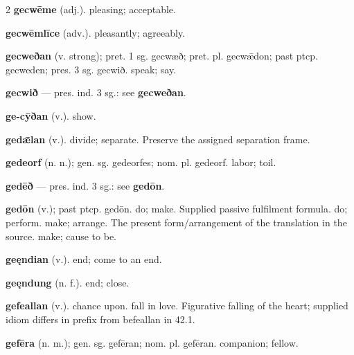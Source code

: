 \begin{multicols*}{2}
\textbf{gecwēme} (adj.). pleasing; acceptable.\par
\textbf{gecwēmlīce} (adv.). pleasantly; agreeably.\par
\textbf{gecweðan} (v. strong); pret. 1 sg. gecwæð; pret. pl. gecwǣdon; past ptcp. gecweden; pres. 3 sg. gecwið. speak; say.\par
\textbf{gecwið} — pres. ind. 3 sg.: see \textbf{gecweðan}.\par
\textbf{ge-cȳðan} (v.). show.\par
\textbf{gedǣlan} (v.). divide; separate. Preserve the assigned separation frame.\par
\textbf{gedeorf} (n. n.); gen. sg. gedeorfes; nom. pl. gedeorf. labor; toil.\par
\textbf{gedēð} — pres. ind. 3 sg.: see \textbf{gedōn}.\par
\textbf{gedōn} (v.); past ptcp. gedōn. do; make. Supplied passive fulfilment formula. do; perform. make; arrange. The present form/arrangement of the translation in the source. make; cause to be.\par
\textbf{geęndian} (v.). end; come to an end.\par
\textbf{geęndung} (n. f.). end; close.\par
\textbf{gefeallan} (v.). chance upon. fall in love. Figurative falling of the heart; supplied idiom differs in prefix from befeallan in 42.1.\par
\textbf{gefēra} (n. m.); gen. sg. gefēran; nom. pl. gefēran. companion; fellow.\par

\end{multicols*}
